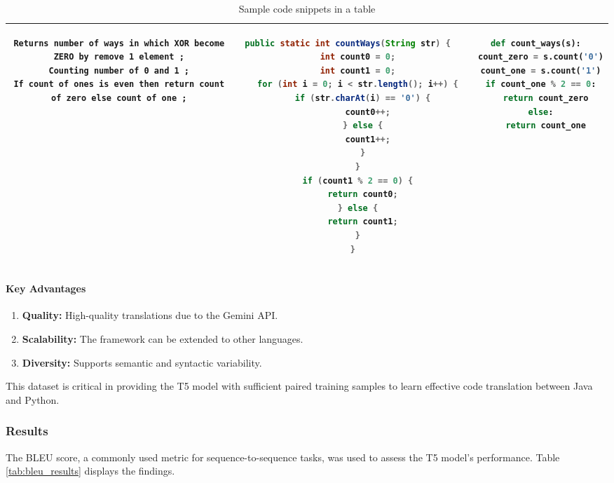 \documentclass{dhbenelux}
\begin{document}
\begin{table}[h!]
{\begin{tabular}{|c|c|c|}
\begin{minipage}[t]{0.3\textwidth}
\begin{lstlisting}[basicstyle=\ttfamily\scriptsize, breaklines=true]
Returns number of ways in which XOR become ZERO by remove 1 element ;
Counting number of 0 and 1 ;
If count of ones is even then return count of zero else count of one ;
\end{lstlisting}
\end{minipage}
&
\begin{minipage}[t]{0.3\textwidth}
\begin{lstlisting}[language=Java, basicstyle=\ttfamily\scriptsize, breaklines=true]
public static int countWays(String str) {
    int count0 = 0;
    int count1 = 0;
    for (int i = 0; i < str.length(); i++) {
      if (str.charAt(i) == '0') {
        count0++;
      } else {
        count1++;
      }
    }
    if (count1 % 2 == 0) {
      return count0;
    } else {
      return count1;
    }
  }
\end{lstlisting}
\end{minipage}
&
\begin{minipage}[t]{0.3\textwidth}
\begin{lstlisting}[language=Python, basicstyle=\ttfamily\scriptsize, breaklines=true]
def count_ways(s):
  count_zero = s.count('0')
  count_one = s.count('1')
  if count_one % 2 == 0:
    return count_zero
  else:
    return count_one
\end{lstlisting}
\end{minipage}
\\
\hline
\end{tabular}
}
\caption{Sample code snippets in a table}
\end{table}

\paragraph{Key Advantages}
\begin{enumerate}
    \item \textbf{Quality:} High-quality translations due to the Gemini API.
    \item \textbf{Scalability:} The framework can be extended to other languages.
    \item \textbf{Diversity:} Supports semantic and syntactic variability.
\end{enumerate}

This dataset is critical in providing the T5 model with sufficient paired training samples to learn effective code translation between Java and Python.

\subsubsection{Results}
The BLEU score, a commonly used metric for sequence-to-sequence tasks, was used to assess the T5 model's performance. Table \ref{tab:bleu_results} displays the findings.
\end{document}
